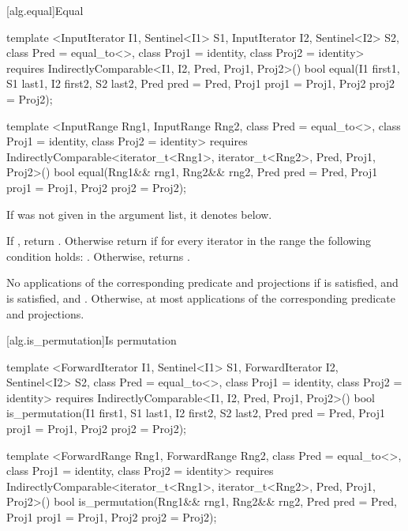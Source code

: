 [alg.equal]{Equal}

%
\begin{itemdecl}
template <InputIterator I1, Sentinel<I1> S1, InputIterator I2, Sentinel<I2> S2,
    class Pred = equal_to<>, class Proj1 = identity, class Proj2 = identity>
  requires IndirectlyComparable<I1, I2, Pred, Proj1, Proj2>()
  bool equal(I1 first1, S1 last1, I2 first2, S2 last2,
             Pred pred = Pred{},
             Proj1 proj1 = Proj1{}, Proj2 proj2 = Proj2{});

template <InputRange Rng1, InputRange Rng2, class Pred = equal_to<>,
    class Proj1 = identity, class Proj2 = identity>
  requires IndirectlyComparable<iterator_t<Rng1>, iterator_t<Rng2>, Pred, Proj1, Proj2>()
  bool equal(Rng1&& rng1, Rng2&& rng2, Pred pred = Pred{},
             Proj1 proj1 = Proj1{}, Proj2 proj2 = Proj2{});
\end{itemdecl}

\begin{itemdescr}
\pnum
\remarks If  was not given in the argument list, it denotes
 below.

\pnum
\returns
If
,
return
.
Otherwise return
if for every iterator
in the range 
the following condition holds:
.
Otherwise, returns
.

\pnum
\complexity
No applications of the corresponding predicate and projections if
 is satisfied, and
 is satisfied,
and
.
Otherwise, at most
applications of the corresponding predicate and projections.
\end{itemdescr}

[alg.is_permutation]{Is permutation}

%
\begin{itemdecl}
template <ForwardIterator I1, Sentinel<I1> S1, ForwardIterator I2,
    Sentinel<I2> S2, class Pred = equal_to<>, class Proj1 = identity,
    class Proj2 = identity>
  requires IndirectlyComparable<I1, I2, Pred, Proj1, Proj2>()
  bool is_permutation(I1 first1, S1 last1, I2 first2, S2 last2,
                      Pred pred = Pred{},
                      Proj1 proj1 = Proj1{}, Proj2 proj2 = Proj2{});

template <ForwardRange Rng1, ForwardRange Rng2, class Pred = equal_to<>,
    class Proj1 = identity, class Proj2 = identity>
  requires IndirectlyComparable<iterator_t<Rng1>, iterator_t<Rng2>, Pred, Proj1, Proj2>()
  bool is_permutation(Rng1&& rng1, Rng2&& rng2, Pred pred = Pred{},
                      Proj1 proj1 = Proj1{}, Proj2 proj2 = Proj2{});
\end{itemdecl}

